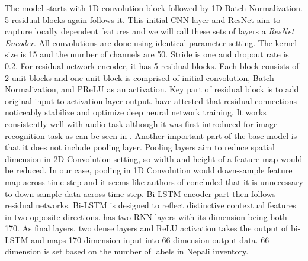 \documentclass[11pt]{article}
\begin{document}
{The model starts with 1D-convolution block followed by 1D-Batch Normalization. 5 residual blocks again follows it. This initial CNN layer and ResNet aim to capture locally dependent features and we will call these sets of layers a \emph{ResNet Encoder}. All convolutions are done using identical parameter setting. The kernel size is 15 and the number of channels are 50. Stride is one and dropout rate is 0.2. For residual network encoder, it has 5 residual blocks. Each block consists of 2 unit blocks and one unit block is comprised of initial convolution, Batch Normalization, and PReLU as an activation. Key part of residual block is to add original input to activation layer output. \cite{ravanelli2019speakerrecognitionrawwaveform} have attested that residual connections noticeably stabilize and optimize deep neural network training. It works consistently well with audio task although it was first introduced for image recognition task as can be seen in \cite{dhakal2022automatic}. Another important part of the base model is that it does not include pooling layer. Pooling layers aim to reduce spatial dimension in 2D Convolution setting, so width and height of a feature map would be reduced. In our case, pooling in 1D Convolution would down-sample feature map across time-step and it seems like authors of \cite{dhakal2022automatic} concluded that it is unnecessary to down-sample data across time-step. Bi-LSTM encoder part then follows residual networks. Bi-LSTM is designed to reflect distinctive contextual features in two opposite directions. \cite{dhakal2022automatic} has two RNN layers with its dimension being both 170. As final layers, two dense layers and ReLU activation takes the output of bi-LSTM and maps 170-dimension input into 66-dimension output data. 66-dimension is set based on the number of labels in Nepali inventory.

}
\end{document}
